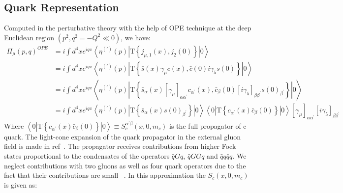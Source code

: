 \subsection{Quark Representation}
Computed in the perturbative theory with the help of OPE technique at the deep Euclidean region $(p^{2}, q^{2} = -Q^{2} \ll 0)$, we have:
\begin{equation}
    \begin{aligned}
        \Pi_\mu(p, q)^{OPE} & = i \int d^4 x e^{i q x}\left\langle \eta^{(\prime)}(p)\left|\mathrm{T}\left\{j_{\mu,1}(x), j_{2}(0)\right\}\right| 0\right\rangle                                                                                                                                                                                                                                      \\
                            & = i \int d^4 x e^{i q x}\left\langle \eta^{(\prime)}(p)\left|\mathrm{T}\left\{\bar{s}(x) \gamma_\mu c(x), \bar{c}(0) i \gamma_5 s(0)\right\}\right| 0\right\rangle                                                                                                                                                                                                      \\
                            & = i \int d^4 x e^{i q x}\left\langle \eta^{(\prime)}(p)\left|\mathrm{T}\left\{\bar{s}_{\alpha}(x) \left[\gamma_{\mu}\right]_{\alpha\alpha^{\prime}} c_{\alpha^{\prime}}(x), \bar{c}_{\beta}(0) \left[i \gamma_{5}\right]_{\beta\beta^{\prime}} s(0)_{\beta^{\prime}}\right\}\right| 0\right\rangle                                                                      \\
                            & = i \int d^4 x e^{i q x}\left\langle \eta^{(\prime)}(p)\left| \mathrm{T}\left\{\bar{s}_{\alpha}(x)s(0)_{\beta^{\prime}}\right\} \right| 0\right\rangle \left\langle 0\left| \mathrm{T}\left\{c_{\alpha^{\prime}}(x) \bar{c}_{\beta}(0)\right\} \right| 0\right\rangle \left[\gamma_{\mu}\right]_{\alpha\alpha^{\prime}} \left[i \gamma_{5}\right]_{\beta\beta^{\prime}}
    \end{aligned}
    \label{eq:quark_rep}
\end{equation}
Where $\left\langle 0\left| \mathrm{T}\left\{c_{\alpha^{\prime}}(x) \bar{c}_{\beta}(0)\right\} \right| 0\right\rangle \equiv S_{c}^{\alpha^{\prime}\beta}\left(x, 0, m_c\right)$ is the full propagator of c quark. The light-cone expansion of the quark propagator in the external gluon field is made in ref~\cite{BalitskyBraun1989}. The propagator receives contributions from higher Fock states proportional to the condensates of the operators $\bar{q}Gq$, $\bar{q}GGq$ and $\bar{q}q\bar{q}q$. We neglect contributions with two gluons as well as four quark operators due to the fact that their contributions are small ~\cite{BraunFilyanov1990}. In this approximation the $S_c\left(x, 0, m_c\right)$ is given as:


